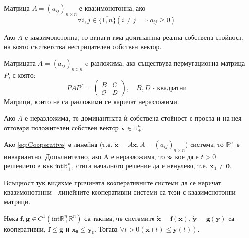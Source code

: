 \begin{definition}
  Матрица $A=(a_{ij})_{n \times n}$ е квазимонотонна, ако
  \begin{equation*}
    \forall{i,j \in \{\overline{1,n}\}} \left(i \neq j \implies a_{ij} \geq 0\right)
  \end{equation*}
\end{definition}

\begin{theorem}
  Ако $A$ е квазимонотонна, то винаги има доминантна реална собствена стойност, на която съответства неотрицателен собствен вектор.
\end{theorem}

\begin{definition}
  Матрицата $A=(a_{ij})_{n \times n}$ e разложима, ако съществува пермутационна матрица $P$, с която:
  \begin{equation*}
    PAP^T =
    \begin{pmatrix}
      B & C \\
      \mathscr{O} & D
    \end{pmatrix}, \quad B, D \text{ - квадратни}
  \end{equation*}
  Матрици, които не са разложими се наричат неразложими.
\end{definition}

\begin{theorem}
  Ако $A$ е неразложима, то доминантната ѝ собствена стойност е проста и на нея отговаря положителен собствен вектор $\mathbf{v} \in \mathbb{R}_{+}^n$.
\end{theorem}

\begin{theorem}
  Ако \eqref{eq:Cooperative} е линейна (т.е. $\dot{\mathbf{x}} = A \mathbf{x}, A = (a_{ij})_{n \times n}$) система, то $\mathbb{R}_{+}^n$ е инвариантно.
  Допълнително, ако A е неразложима, то за кое да е $t > 0$ решението е във $\mathrm{int} \mathbb{R}_{+}^n$, стига началното решение да е ненулево, т.е. $\mathbf{x}_0 \neq \mathbf{0}$.
\end{theorem}

Всъщност тук видяхме причината кооперативните системи да се наричат квазимонотонни - линейните кооперативни системи са тези с квазимонотонни матрици.

\begin{theorem}
  \label{thm:Comparison}
  Нека $\mathbf{f}, \mathbf{g} \in C^1(\mathrm{int} \mathbb{R}_{+}^n \mathbb{R}^n)$ са такива, че системите $\dot{\mathbf{x}}=\mathbf{f}(\mathbf{x})$, $\dot{\mathbf{y}}=\mathbf{g}(\mathbf{y})$ са кооперативни, $\mathbf{f} \leq \mathbf{g}$ и $\mathbf{x}_0 \leq \mathbf{y}_0$. Тогава $\forall{t>0}(\mathbf{x}(t) \leq \mathbf{y}(t))$.
\end{theorem}

